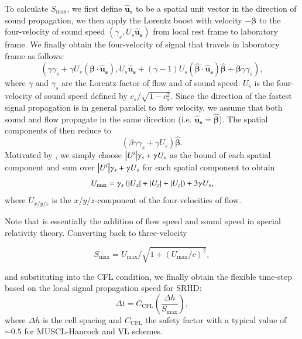\documentclass[twocolumn]{aastex63}
\begin{document}
To calculate $S_{\text{max}}$, we first define $\mathbf{\hat{u}_s}$ to be a spatial unit vector in the direction of sound propagation, we then apply the Lorentz boost with velocity $-\pmb{\beta}$ to the four-velocity of sound speed $(\gamma_s, U_s\mathbf{\hat{u}_s})$ from local rest frame to laboratory frame. We finally obtain the four-velocity of signal that travels in laboratory frame as follows:
\begin{equation}
    \left(\gamma\gamma_s+\gamma U_s\left(\pmb{\beta}\cdot\mathbf{\hat{u}_s}\right),U_{s}\mathbf{\mathbf{\hat{u}_s}}+\left(\gamma-1\right)U_s\left(\pmb{\hat{\beta}}\cdot\mathbf{\hat{u}_s}\right)\pmb{\hat{\beta}}+\pmb{\beta}\gamma\gamma_s\right),
    \label{time_step_propagation of information}
\end{equation}
where $\gamma$ and $\gamma_s$ are the Lorentz factor of flow and of sound speed. $U_s$ is the four-velocity of sound speed defined by $c_s/\sqrt{1-c_s^2}$. Since the direction of the fastest signal propagation is in general parallel to flow velocity, we assume that both sound and flow propagate in the same direction (i.e. $\mathbf{\hat{u}_s}=\pmb{\hat{\beta}}$). The spatial components of  then reduce to
\begin{equation}
    \left(\beta \gamma \gamma_s+\gamma U_s\right)\pmb{\hat{\beta}}.
    \label{time_step_x}
\end{equation}
Motivated by , we simply choose $\abs{U^{i}}\gamma_s+\gamma U_s$ as the bound of each spatial component and sum over $\abs{U^{i}}\gamma_s+\gamma U_s$ for each spatial component to obtain
\begin{equation}
U_{\text{max}}
=\gamma_{s}\left(\abs{U_{x}}+\abs{U_{z}}+\abs{U_{z}}\right)+3\gamma U_s,
\label{time_step_U_max}
\end{equation}
where $U_{x/y/z}$ is the $x/y/z$-component of the four-velocities of flow.

Note that  is essentially the addition of flow speed and sound speed in special relativity theory. Converting  back to three-velocity

\begin{equation}
S_{\text{max}}=U_{\text{max}}/\sqrt{1+\left(U_{\text{max}}/c\right)^2}, \label{SMax}
\end{equation}

and substituting  into the CFL condition, we finally obtain the flexible time-step based on the local signal propagation speed for SRHD:
\begin{equation}
\label{time_step_sound_speed}
\Delta t = C_{\text{CFL}}\left(\frac{\Delta h}{S_{\text{max}}}\right),
\end{equation}
where $\Delta h$ is the cell spacing and $C_{\text{CFL}}$ the safety factor with a typical value of $\sim 0.5$ for MUSCL-Hancock and VL schemes.
\end{document}
